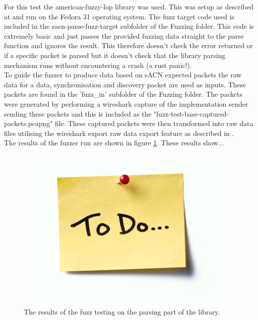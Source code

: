 \documentclass[11pt,a4paper]{article}
\begin{document}
For this test the american-fuzzy-lop library \cite{RUST_AFL_FUZZ} was used. This was setup as described at \cite{RUST_AFL_FUZZ_DOC} and run on the Fedora 31 operating system. The fuzz target code used is included in the sacn-parse-fuzz-target subfolder of the Fuzzing folder. This code is extremely basic and just passes the provided fuzzing data straight to the parse function and ignores the result. This therefore doesn't check the error returned or if a specific packet is parsed but it doesn't check that the library parsing mechanism runs without encountering a crash (a rust panic!).\\

To guide the fuzzer to produce data based on sACN expected packets the raw data for a data, synchronisation and discovery packet are used as inputs. These packets are found in the 'fuzz\_in' subfolder of the Fuzzing folder. The packets were generated by performing a wireshark capture of the implementation sender sending these packets and this is included as the "fuzz-test-base-captured-packets.pcapng" file. These captured packets were then transformed into raw data files utilising the wireshark export raw data export feature as described in \cite{WIRESHARK_EXPORT_RAW}.\\

The results of the fuzzer run are shown in figure \ref{FUZZ_RESULTS}. These results show...

\begin{figure}[H]
	\label{FUZZ_RESULTS}
	\includegraphics[width=\textwidth]{todo}
	\caption{The results of the fuzz testing on the parsing part of the library.}
\end{figure}
\end{document}
